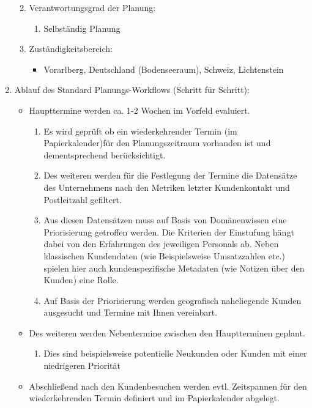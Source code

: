 \documentclass[Bachelorarbeit.tex]{subfiles}
\begin{document}
\begin{enumerate}
\begin{enumerate}
\begin{itemize}
		\end{itemize}
		\item Verantwortungsgrad der Planung:
		\begin{enumerate}
			\item[] Selbständig Planung
		\end{enumerate}
		\item Zuständigkeitsbereich:
		\begin{itemize}
			\item[] Vorarlberg, Deutschland (Bodenseeraum), Schweiz, Lichtenstein
		\end{itemize}
	\end{enumerate}
	\item Ablauf des Standard Planungs-Workflows (Schritt für Schritt):
	\begin{itemize}
		\item[] Haupttermine werden ca. 1-2 Wochen im Vorfeld evaluiert. 
		\begin{enumerate}
			\item Es wird geprüft ob ein wiederkehrender Termin (im Papierkalender)für den Planungszeitraum vorhanden ist und dementsprechend berücksichtigt.
			\item Des weiteren werden für die Festlegung der Termine die Datensätze des Unternehmens nach den Metriken letzter Kundenkontakt und Postleitzahl  gefiltert.
			\item Aus diesen Datensätzen muss auf Basis von Domänenwissen eine Priorisierung getroffen werden. Die Kriterien der Einstufung hängt dabei von den Erfahrungen des jeweiligen Personals ab. Neben klassischen Kundendaten (wie Beispielsweise Umsatzzahlen etc.) spielen hier auch kundenspezifische Metadaten (wie Notizen über den Kunden) eine Rolle.
			\item Auf Basis der Priorisierung werden geografisch naheliegende Kunden ausgesucht und Termine mit Ihnen vereinbart.
		\end{enumerate}
		\item[] Des weiteren werden Nebentermine zwischen den Hauptterminen geplant.
		\begin{enumerate}
			\item Dies sind beispielsweise potentielle Neukunden oder Kunden mit einer niedrigeren Priorität 
		\end{enumerate}
		\item[] Abschließend nach den Kundenbesuchen werden evtl. Zeitspannen für den wiederkehrenden Termin definiert und im Papierkalender abgelegt.
	\end{itemize}
	

\end{enumerate}
\end{document}

